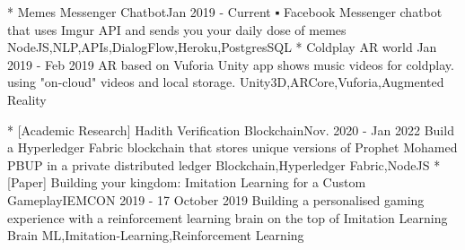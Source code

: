 %
%

\twocolumnsection
{ 
\begin{projects}
		\project
	{* Memes Messenger Chatbot}{Jan 2019 - Current}
	{ }
	{▪	Facebook Messenger chatbot that uses Imgur API and sends you your daily dose of memes }
	{NodeJS,NLP,APIs,DialogFlow,Heroku,PostgresSQL}
		\project
	{* Coldplay AR world }{Jan 2019 - Feb 2019}
	{ 
	}
	{AR based on Vuforia Unity app shows music videos for coldplay. using "on-cloud" videos and local storage.}
	{Unity3D,ARCore,Vuforia,Augmented Reality}
\end{projects}}
{
\begin{projects}
		\project
	{* [Academic Research] Hadith Verification Blockchain}{Nov. 2020 - Jan 2022}
	{}
	{Build a Hyperledger Fabric blockchain that stores unique versions of Prophet Mohamed PBUP in a private distributed ledger }
	{Blockchain,Hyperledger Fabric,NodeJS}	
			\project
	{* [Paper] Building your kingdom: Imitation Learning for a Custom Gameplay}{IEMCON 2019 - 17 October 2019}
	{\paperSymbol{ }
	}
	{Building a personalised gaming experience with a reinforcement learning brain on the top of Imitation Learning Brain}
	{ML,Imitation-Learning,Reinforcement Learning} \\
\end{projects}}


